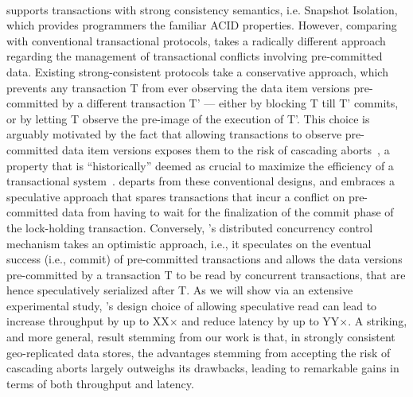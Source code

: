 ~\\

\specula supports transactions with strong consistency semantics, i.e. Snapshot Isolation, which provides programmers the familiar ACID properties. However, comparing with conventional transactional protocols, \specula takes a radically different approach regarding the management of transactional conflicts involving pre-committed data. Existing strong-consistent protocols take a conservative approach, which prevents any transaction T from ever observing the data item versions pre-committed by a different transaction T' --- either by blocking T till T' commits, or by letting T observe the pre-image of the execution of T'. This choice is arguably motivated by the fact that allowing transactions to observe pre-committed data item versions exposes them to the risk of cascading aborts~\cite{xxx}, a property that is ``historically'' deemed as crucial to maximize the efficiency of a transactional system~\cite{textbooks-on-db}. \specula departs from these conventional designs, and embraces a speculative approach that spares transactions that incur a conflict on pre-committed data from having to wait for the finalization of the commit phase of the lock-holding transaction. Conversely, \specula's distributed concurrency control mechanism takes an optimistic approach, i.e., it speculates on the eventual success (i.e., commit) of pre-committed transactions and allows the data versions pre-committed by a transaction T to be read by concurrent transactions, that are hence speculatively serialized after T. As we will show via an extensive experimental study, \specula's design choice of allowing speculative read can lead to increase throughput by up to XX$\times$ and reduce latency by up to YY$\times$. A striking, and more general, result stemming from our work is that, in strongly consistent geo-replicated data stores, the advantages stemming from accepting the risk of cascading aborts largely outweighs its drawbacks, leading to remarkable gains in terms of both throughput and latency.

